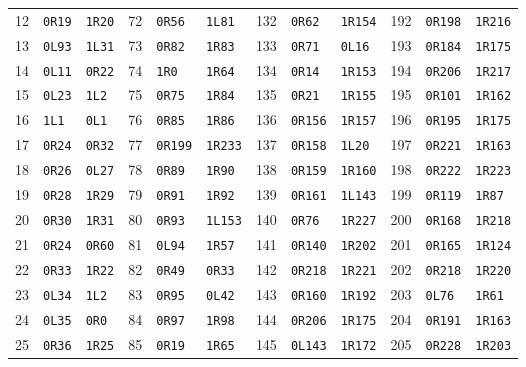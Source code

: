 \begin{tabular}{rll@{\hspace{12pt}}rll@{\hspace{12pt}}rll@{\hspace{12pt}}rll}
12 & \texttt{0R19} & \texttt{1R20} & 72 & \texttt{0R56} & \texttt{1L81} & 132 & \texttt{0R62} & \texttt{1R154} & 192 & \texttt{0R198} & \texttt{1R216}\\
13 & \texttt{0L93} & \texttt{1L31} & 73 & \texttt{0R82} & \texttt{1R83} & 133 & \texttt{0R71} & \texttt{0L16} & 193 & \texttt{0R184} & \texttt{1R175}\\
14 & \texttt{0L11} & \texttt{0R22} & 74 & \texttt{1R0} & \texttt{1R64} & 134 & \texttt{0R14} & \texttt{1R153} & 194 & \texttt{0R206} & \texttt{1R217}\\
15 & \texttt{0L23} & \texttt{1L2} & 75 & \texttt{0R75} & \texttt{1R84} & 135 & \texttt{0R21} & \texttt{1R155} & 195 & \texttt{0R101} & \texttt{1R162}\\
16 & \texttt{1L1} & \texttt{0L1} & 76 & \texttt{0R85} & \texttt{1R86} & 136 & \texttt{0R156} & \texttt{1R157} & 196 & \texttt{0R195} & \texttt{1R175}\\
17 & \texttt{0R24} & \texttt{0R32} & 77 & \texttt{0R199} & \texttt{1R233} & 137 & \texttt{0R158} & \texttt{1L20} & 197 & \texttt{0R221} & \texttt{1R163}\\
18 & \texttt{0R26} & \texttt{0L27} & 78 & \texttt{0R89} & \texttt{1R90} & 138 & \texttt{0R159} & \texttt{1R160} & 198 & \texttt{0R222} & \texttt{1R223}\\
19 & \texttt{0R28} & \texttt{1R29} & 79 & \texttt{0R91} & \texttt{1R92} & 139 & \texttt{0R161} & \texttt{1L143} & 199 & \texttt{0R119} & \texttt{1R87}\\
20 & \texttt{0R30} & \texttt{1R31} & 80 & \texttt{0R93} & \texttt{1L153} & 140 & \texttt{0R76} & \texttt{1R227} & 200 & \texttt{0R168} & \texttt{1R218}\\
21 & \texttt{0R24} & \texttt{0R60} & 81 & \texttt{0L94} & \texttt{1R57} & 141 & \texttt{0R140} & \texttt{1R202} & 201 & \texttt{0R165} & \texttt{1R124}\\
22 & \texttt{0R33} & \texttt{1R22} & 82 & \texttt{0R49} & \texttt{0R33} & 142 & \texttt{0R218} & \texttt{1R221} & 202 & \texttt{0R218} & \texttt{1R220}\\
23 & \texttt{0L34} & \texttt{1L2} & 83 & \texttt{0R95} & \texttt{0L42} & 143 & \texttt{0R160} & \texttt{1R192} & 203 & \texttt{0L76} & \texttt{1R61}\\
24 & \texttt{0L35} & \texttt{0R0} & 84 & \texttt{0R97} & \texttt{1R98} & 144 & \texttt{0R206} & \texttt{1R175} & 204 & \texttt{0R191} & \texttt{1R163}\\
25 & \texttt{0R36} & \texttt{1R25} & 85 & \texttt{0R19} & \texttt{1R65} & 145 & \texttt{0L143} & \texttt{1R172} & 205 & \texttt{0R228} & \texttt{1R203}\\

\end{tabular}
